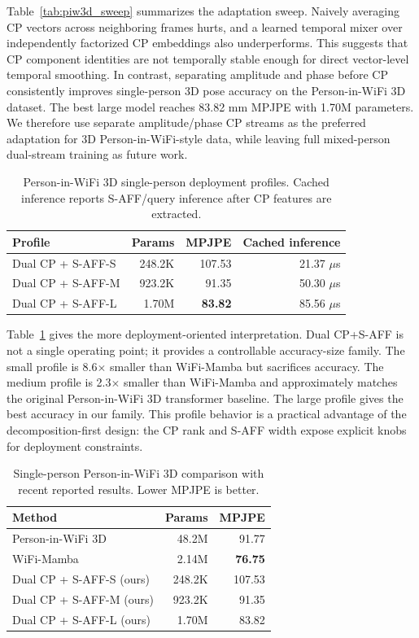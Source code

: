 \documentclass[10pt,conference]{IEEEtran}
\begin{document}
Table~\ref{tab:piw3d_sweep} summarizes the adaptation sweep. Naively averaging CP vectors across neighboring frames hurts, and a learned temporal mixer over independently factorized CP embeddings also underperforms. This suggests that CP component identities are not temporally stable enough for direct vector-level temporal smoothing. In contrast, separating amplitude and phase before CP consistently improves single-person 3D pose accuracy on the Person-in-WiFi 3D dataset. The best large model reaches 83.82 mm MPJPE with 1.70M parameters. We therefore use separate amplitude/phase CP streams as the preferred adaptation for 3D Person-in-WiFi-style data, while leaving full mixed-person dual-stream training as future work.

\begin{table}[t]
\centering
\caption{Person-in-WiFi 3D single-person deployment profiles. Cached inference reports S-AFF/query inference after CP features are extracted.}
\label{tab:piw3d_profiles}
\begin{tabular}{lrrr}
\toprule
Profile & Params & MPJPE & Cached inference \\
\midrule
Dual CP + S-AFF-S & 248.2K & 107.53 & 21.37 $\mu$s \\
Dual CP + S-AFF-M & 923.2K & 91.35 & 50.30 $\mu$s \\
Dual CP + S-AFF-L & 1.70M & \textbf{83.82} & 85.56 $\mu$s \\
\bottomrule
\end{tabular}
\end{table}

Table~\ref{tab:piw3d_profiles} gives the more deployment-oriented interpretation. Dual CP+S-AFF is not a single operating point; it provides a controllable accuracy-size family. The small profile is 8.6$\times$ smaller than WiFi-Mamba but sacrifices accuracy. The medium profile is 2.3$\times$ smaller than WiFi-Mamba and approximately matches the original Person-in-WiFi 3D transformer baseline. The large profile gives the best accuracy in our family. This profile behavior is a practical advantage of the decomposition-first design: the CP rank and S-AFF width expose explicit knobs for deployment constraints.

\begin{table}[t]
\centering
\caption{Single-person Person-in-WiFi 3D comparison with recent reported results. Lower MPJPE is better.}
\label{tab:piw3d_sota}
\begin{tabular}{lrr}
\toprule
Method & Params & MPJPE \\
\midrule
Person-in-WiFi 3D~\cite{personwifi3d2024} & 48.2M & 91.77 \\
WiFi-Mamba~\cite{wifimamba2026} & 2.14M & \textbf{76.75} \\
Dual CP + S-AFF-S (ours) & 248.2K & 107.53 \\
Dual CP + S-AFF-M (ours) & 923.2K & 91.35 \\
Dual CP + S-AFF-L (ours) & 1.70M & 83.82 \\
\bottomrule
\end{tabular}
\end{table}
\end{document}
